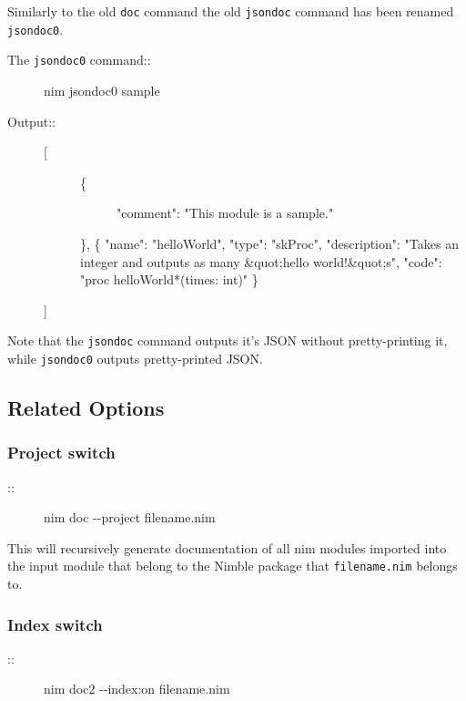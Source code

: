 Similarly to the old \texttt{doc} command the old \texttt{jsondoc}
command has been renamed \texttt{jsondoc0}.

\begin{description}
\item[The \texttt{jsondoc0} command::]
nim jsondoc0 sample
\item[Output::]
\begin{description}
\item[{[}]
\begin{description}
\item[\{]
"comment": "This module is a sample."
\end{description}

\}, \{ "name": "helloWorld", "type": "skProc", "description": "Takes an
integer and outputs as many \&quot;hello world!\&quot;s", "code": "proc
helloWorld*(times: int)" \}
\end{description}

{]}
\end{description}

Note that the \texttt{jsondoc} command outputs it's JSON without
pretty-printing it, while \texttt{jsondoc0} outputs pretty-printed JSON.

\hypertarget{related-options}{%
\subsection{Related Options}\label{related-options}}

\hypertarget{project-switch}{%
\subsubsection{Project switch}\label{project-switch}}

\begin{description}
\item[::]
nim doc -\/-project filename.nim
\end{description}

This will recursively generate documentation of all nim modules imported
into the input module that belong to the Nimble package that
\texttt{filename.nim} belongs to.

\hypertarget{index-switch}{%
\subsubsection{Index switch}\label{index-switch}}

\begin{description}
\item[::]
nim doc2 -\/-index:on filename.nim
\end{description}

